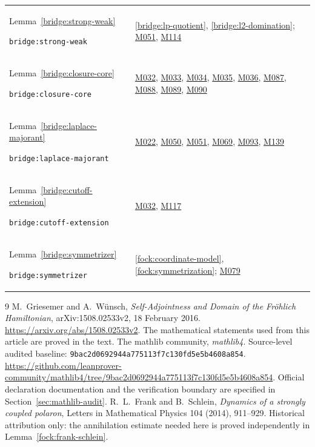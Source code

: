 \documentclass[11pt,a4paper]{article}
\theoremstyle{definition}
\theoremstyle{remark}
\begin{document}
\begin{longtable}{@{}p{}p{}@{}}
Lemma~\ref{bridge:strong-weak}\par\nolinkurl{bridge:strong-weak} & \ref{bridge:lp-quotient}, \ref{bridge:l2-domination}; \hyperref[base:M051]{M051}, \hyperref[base:M114]{M114} \\[4pt]
Lemma~\ref{bridge:closure-core}\par\nolinkurl{bridge:closure-core} & \hyperref[base:M032]{M032}, \hyperref[base:M033]{M033}, \hyperref[base:M034]{M034}, \hyperref[base:M035]{M035}, \hyperref[base:M036]{M036}, \hyperref[base:M087]{M087}, \hyperref[base:M088]{M088}, \hyperref[base:M089]{M089}, \hyperref[base:M090]{M090} \\[4pt]
Lemma~\ref{bridge:laplace-majorant}\par\nolinkurl{bridge:laplace-majorant} & \hyperref[base:M022]{M022}, \hyperref[base:M050]{M050}, \hyperref[base:M051]{M051}, \hyperref[base:M069]{M069}, \hyperref[base:M093]{M093}, \hyperref[base:M139]{M139} \\[4pt]
Lemma~\ref{bridge:cutoff-extension}\par\nolinkurl{bridge:cutoff-extension} & \hyperref[base:M032]{M032}, \hyperref[base:M117]{M117} \\[4pt]
Lemma~\ref{bridge:symmetrizer}\par\nolinkurl{bridge:symmetrizer} & \ref{fock:coordinate-model}, \ref{fock:symmetrization}; \hyperref[base:M079]{M079} \\[4pt]
\end{longtable}
\endgroup

\begin{thebibliography}{9}
 M.~Griesemer and A.~W\"unsch,
\emph{Self-Adjointness and Domain of the Fr\"ohlich Hamiltonian},
arXiv:1508.02533v2, 18 February 2016.
\url{https://arxiv.org/abs/1508.02533v2}.
The mathematical statements used from this article are proved in the text.
 The mathlib community, \emph{mathlib4}.
Source-level audited baseline:
\nolinkurl{9bac2d0692944a775113f7c130fd5e5b4608a854}.
\url{https://github.com/leanprover-community/mathlib4/tree/9bac2d0692944a775113f7c130fd5e5b4608a854}.
Official declaration documentation and the verification boundary are
specified in Section~\ref{sec:mathlib-audit}.
 R.~L.~Frank and B.~Schlein,
\emph{Dynamics of a strongly coupled polaron},
Letters in Mathematical Physics 104 (2014), 911--929.
Historical attribution only: the annihilation estimate needed here
is proved independently in Lemma~\ref{fock:frank-schlein}.
\end{thebibliography}
\end{document}
